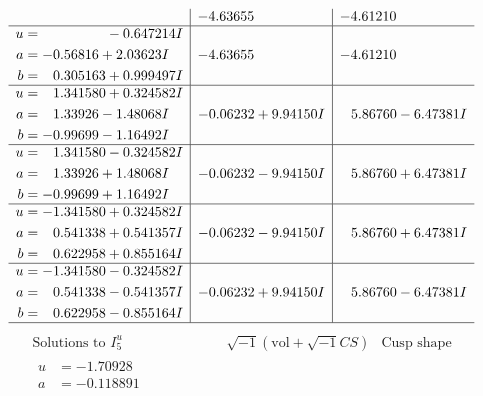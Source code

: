 \documentclass[1p]{elsarticle_modified}
\theoremstyle{definition}
\newcommand{\I}{\sqrt{-1}}
\begin{document}
$$\begin{array}{c|c|c}
 & -4.63655\phantom{ +0.000000I} & -4.61210\phantom{ +0.000000I} \\ \hline\begin{aligned}
u &= \phantom{-0.000000 } -0.647214 I \\
a &= -0.56816 + 2.03623 I \\
b &= \phantom{-}0.305163 + 0.999497 I\end{aligned}
 & -4.63655\phantom{ +0.000000I} & -4.61210\phantom{ +0.000000I} \\ \hline\begin{aligned}
u &= \phantom{-}1.341580 + 0.324582 I \\
a &= \phantom{-}1.33926 - 1.48068 I \\
b &= -0.99699 - 1.16492 I\end{aligned}
 & -0.06232 + 9.94150 I & \phantom{-}5.86760 - 6.47381 I \\ \hline\begin{aligned}
u &= \phantom{-}1.341580 - 0.324582 I \\
a &= \phantom{-}1.33926 + 1.48068 I \\
b &= -0.99699 + 1.16492 I\end{aligned}
 & -0.06232 - 9.94150 I & \phantom{-}5.86760 + 6.47381 I \\ \hline\begin{aligned}
u &= -1.341580 + 0.324582 I \\
a &= \phantom{-}0.541338 + 0.541357 I \\
b &= \phantom{-}0.622958 + 0.855164 I\end{aligned}
 & -0.06232 - 9.94150 I & \phantom{-}5.86760 + 6.47381 I \\ \hline\begin{aligned}
u &= -1.341580 - 0.324582 I \\
a &= \phantom{-}0.541338 - 0.541357 I \\
b &= \phantom{-}0.622958 - 0.855164 I\end{aligned}
 & -0.06232 + 9.94150 I & \phantom{-}5.86760 - 6.47381 I\\
 \hline 
 \end{array}$$\newpage$$\begin{array}{c|c|c}  
\text{Solutions to }I^u_{5}& \I (\text{vol} + \sqrt{-1}CS) & \text{Cusp shape}\\
 \hline 
\begin{aligned}
u &= -1.70928\phantom{ +0.000000I} \\
a &= -0.118891\phantom{ +0.000000I} \\

\end{aligned}
\end{array}$$
\end{document}

